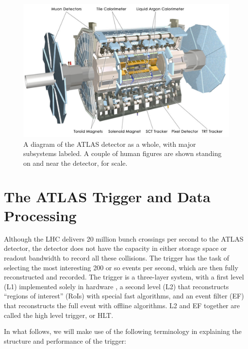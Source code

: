 \begin{figure}
	\includegraphics[width=\textwidth]{ATLASDetector/images/AtlasDetectorLabeled.pdf}	\caption{A diagram of the ATLAS detector as a whole, with major subsystems labeled.  A couple of human figures are shown standing on and near the detector, for scale. \label{fig:detector}}
\end{figure}

\section{The ATLAS Trigger and Data Processing}
\label{sec:atlas_trig}
Although the LHC delivers 20 million bunch crossings per second to the ATLAS detector, the detector does not have 
the capacity in either storage space or readout bandwidth to record all these collisions.  The trigger has the task 
of selecting the most interesting 200 or so events per second, which are then fully reconstructed and recorded.  
The trigger is a three-layer system, with a first level (L1) implemented solely in hardware
, a second level (L2) that reconstructs ``regions of interest'' (RoIs) with special fast 
algorithms, and an event filter (EF) that reconstructs the full event with offline algorithms.  L2 and 
EF together are called the high level trigger, or HLT.

In what follows, we will make use of the following terminology in explaining the structure and performance of the trigger:

